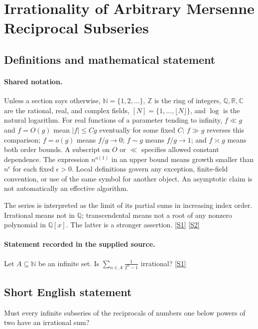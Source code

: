 \documentclass[11pt,a4paper]{article}
\newcommand{\N}{\mathbb{N}}
\newcommand{\Z}{\mathbb{Z}}
\newcommand{\Q}{\mathbb{Q}}
\newcommand{\R}{\mathbb{R}}
\newcommand{\C}{\mathbb{C}}
\newcommand{\sref}[2]{\hyperlink{source:#1:#2}{[S#2]}}
\begin{document}
\section{Irrationality of Arbitrary Mersenne Reciprocal Subseries}\label{statement}


\subsection{Definitions and mathematical statement}

\paragraph{Shared notation.}Unless a section says otherwise, $\N=\{1,2,\ldots\}$,
$\Z$ is the ring of integers, $\Q,\R,\C$ are the rational, real, and complex
fields, $[N]=\{1,\ldots,\lfloor N\rfloor\}$, and $\log$ is the natural
logarithm. For real functions of a parameter tending to infinity,
$f\ll g$ and $f=O(g)$ mean $|f|\leq Cg$ eventually for some fixed $C$;
$f\gg g$ reverses this comparison; $f=o(g)$ means $f/g\to0$;
$f\sim g$ means $f/g\to1$; and $f\asymp g$ means both order bounds.
A subscript on $O$ or $\ll$ specifies allowed constant dependence.
The expression $n^{o(1)}$ in an upper bound means growth smaller than
$n^\epsilon$ for each fixed $\epsilon>0$. Local definitions govern any
exception, finite-field convention, or use of the same symbol for another
object. An asymptotic claim is not automatically an effective algorithm.



The series is interpreted as the limit of its partial sums in increasing index order. Irrational means not in $\Q$; transcendental means not a root of any nonzero polynomial in $\Q[x]$. The latter is a stronger assertion. \sref{statement}{1} \sref{statement}{2}

\paragraph{Statement recorded in the supplied source.}
Let $A\subseteq \mathbb{N}$ be an infinite set. Is $ \sum_{n\in A}\frac{1}{2^n-1} $ irrational? \sref{statement}{1}

\subsection{Short English statement}

Must every infinite subseries of the reciprocals of numbers one below powers of two have an irrational sum?
\end{document}
